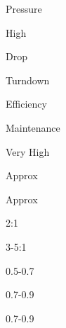 \documentclass[a4paper,portrait,12pt]{article}
\begin{document}
\begin{flushleft}
Pressure
\end{flushleft}





\begin{flushleft}
High
\end{flushleft}





\begin{flushleft}
Drop
\end{flushleft}


\begin{flushleft}
Turndown
\end{flushleft}


\begin{flushleft}
Efficiency
\end{flushleft}


\begin{flushleft}
Maintenance
\end{flushleft}





\begin{flushleft}
Very High
\end{flushleft}





\begin{flushleft}
Approx
\end{flushleft}





\begin{flushleft}
Approx
\end{flushleft}





2:1





3-5:1





0.5-0.7





0.7-0.9





0.7-0.9
\end{document}
